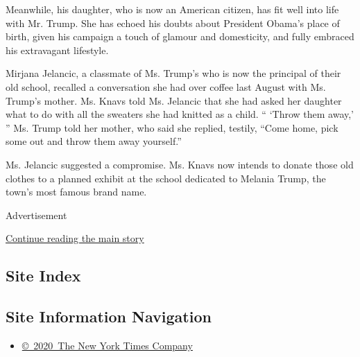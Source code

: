Meanwhile, his daughter, who is now an American citizen, has fit well
into life with Mr. Trump. She has echoed his doubts about President
Obama's place of birth, given his campaign a touch of glamour and
domesticity, and fully embraced his extravagant lifestyle.

Mirjana Jelancic, a classmate of Ms. Trump's who is now the principal of
their old school, recalled a conversation she had over coffee last
August with Ms. Trump's mother. Ms. Knavs told Ms. Jelancic that she had
asked her daughter what to do with all the sweaters she had knitted as a
child. `` `Throw them away,' '' Ms. Trump told her mother, who said she
replied, testily, ``Come home, pick some out and throw them away
yourself.''

Ms. Jelancic suggested a compromise. Ms. Knavs now intends to donate
those old clothes to a planned exhibit at the school dedicated to
Melania Trump, the town's most famous brand name.

Advertisement

\protect\hyperlink{after-bottom}{Continue reading the main story}

\hypertarget{site-index}{%
\subsection{Site Index}\label{site-index}}

\hypertarget{site-information-navigation}{%
\subsection{Site Information
Navigation}\label{site-information-navigation}}

\begin{itemize}
\tightlist
\item
  \href{https://help.nytimes3xbfgragh.onion/hc/en-us/articles/115014792127-Copyright-notice}{©~2020~The
  New York Times Company}
\end{itemize}


